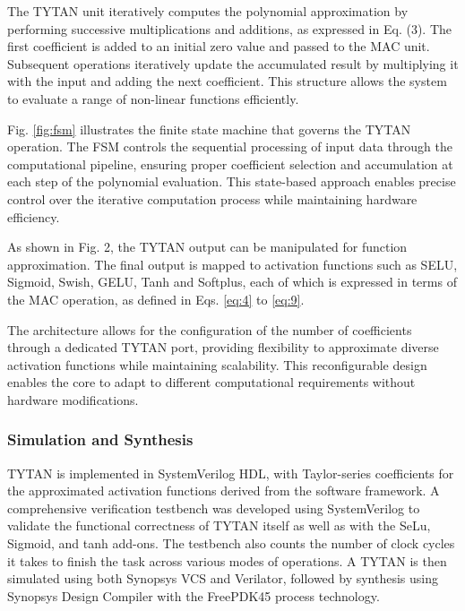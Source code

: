 \documentclass[conference,10pt]{IEEEtran}
\begin{document}
        The TYTAN unit iteratively computes the polynomial approximation by performing successive multiplications and additions, as expressed in Eq. (3). The first coefficient is added to an initial zero value and passed to the MAC unit. Subsequent operations iteratively update the accumulated result by multiplying it with the input and adding the next coefficient. This structure allows the system to evaluate a range of non-linear functions efficiently.
        
        Fig. \ref{fig:fsm} illustrates the finite state machine that governs the TYTAN operation. The FSM controls the sequential processing of input data through the computational pipeline, ensuring proper coefficient selection and accumulation at each step of the polynomial evaluation. This state-based approach enables precise control over the iterative computation process while maintaining hardware efficiency.
        
        As shown in Fig. 2, the TYTAN output can be manipulated for function approximation. The final output is mapped to activation functions such as SELU, Sigmoid, Swish, GELU, Tanh and Softplus, each of which is expressed in terms of the MAC operation, as defined in Eqs. \ref{eq:4} to \ref{eq:9}.
        
        The architecture allows for the configuration of the number of coefficients through a dedicated TYTAN port, providing flexibility to approximate diverse activation functions while maintaining scalability. This reconfigurable design enables the core to adapt to different computational requirements without hardware modifications.
    
    \subsubsection{Simulation and Synthesis}
        TYTAN is implemented in SystemVerilog HDL, with Taylor-series coefficients for the approximated activation functions derived from the software framework. A comprehensive verification testbench was developed using SystemVerilog to validate the functional correctness of TYTAN itself as well as with the SeLu, Sigmoid, and tanh add-ons. The testbench also counts the number of clock cycles it takes to finish the task across various modes of operations. A TYTAN is then simulated using both Synopsys VCS and Verilator, followed by synthesis using Synopsys Design Compiler with the FreePDK45 process technology.
\end{document}
